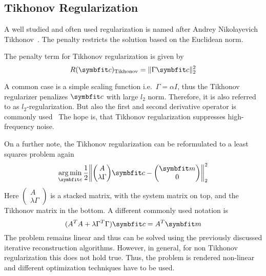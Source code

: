 \subsection{Tikhonov Regularization}\label{subsec:tikhonov_regularization}

A well studied and often used regularization is named after Andrey Nikolayevich
Tikhonov~\cite{tihonov_solution_1963}. The penalty restricts the solution based on the Euclidean
norm.

\begin{definition}\label{def:tikhonov_regularization}
	The penalty term for Tikhonov regularization is given by
	\[
		R(\mvec{c})_{\text{Tikhonov}} = \norm{\Gamma \mvec{c}}_2^2
	\]
\end{definition}
A common case is a simple scaling function i.e.\ \(\Gamma = \alpha I\), thus the Tikhonov
regularizer penalizes \(\mvec{c}\) with large \(l_2\) norm. Therefore, it is also referred to as
\(l_2\)-regularization. But also the first and second derivative operator is commonly
used~\cite{golub_tikhonov_1999} The hope is, that Tikhonov regularization suppresses high-frequency
noise.

On a further note, the Tikhonov regularization can be reformulated to a least squares problem again
\begin{equation}
	\argmin_{\mvec{c}} \frac{1}{2}
	\left\lVert
	\begin{pmatrix}
		A \\
		\lambda \Gamma
	\end{pmatrix}
	\mvec{c} -
	\begin{pmatrix}
		\mvec{m} \\
		0
	\end{pmatrix}
	\right\rVert_2^2
\end{equation}
Here \(\begin{pmatrix}
	A \\
	\lambda \Gamma
\end{pmatrix}\) is a stacked matrix, with the system matrix on top, and the Tikhonov matrix in the
bottom. A different commonly used notation is
\begin{equation}
	(A^T A + \lambda \Gamma^T \Gamma)\mvec{c} = A^T \mvec{m}
\end{equation}
The problem remains linear and thus can be solved using the previously discussed iterative
reconstruction algorithms. However, in general, for non Tikhonov regularization this does not hold
true. Thus, the problem is rendered non-linear and different optimization techniques have to be
used.

